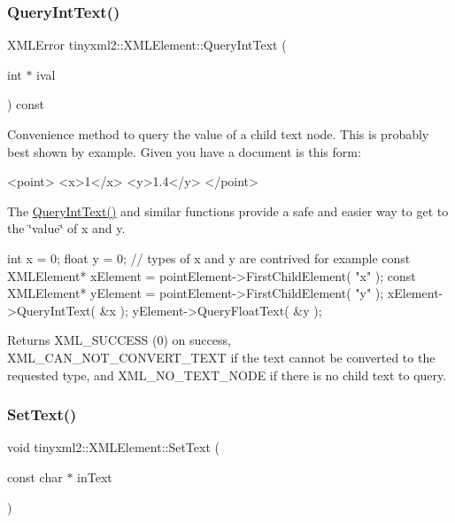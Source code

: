 \subsubsection{\texorpdfstring{QueryIntText()}{QueryIntText()}}
{\footnotesize\ttfamily X\+M\+L\+Error tinyxml2\+::\+X\+M\+L\+Element\+::\+Query\+Int\+Text (\begin{DoxyParamCaption}\item[{int $\ast$}]{ival }\end{DoxyParamCaption}) const}

Convenience method to query the value of a child text node. This is probably best shown by example. Given you have a document is this form\+: \begin{DoxyVerb}    <point>
        <x>1</x>
        <y>1.4</y>
    </point>
\end{DoxyVerb}


The \mbox{\hyperlink{classtinyxml2_1_1XMLElement_a926357996bef633cb736e1a558419632}{Query\+Int\+Text()}} and similar functions provide a safe and easier way to get to the \char`\"{}value\char`\"{} of x and y.

\begin{DoxyVerb}    int x = 0;
    float y = 0;    // types of x and y are contrived for example
    const XMLElement* xElement = pointElement->FirstChildElement( "x" );
    const XMLElement* yElement = pointElement->FirstChildElement( "y" );
    xElement->QueryIntText( &x );
    yElement->QueryFloatText( &y );
\end{DoxyVerb}


\begin{DoxyReturn}{Returns}
X\+M\+L\+\_\+\+S\+U\+C\+C\+E\+SS (0) on success, X\+M\+L\+\_\+\+C\+A\+N\+\_\+\+N\+O\+T\+\_\+\+C\+O\+N\+V\+E\+R\+T\+\_\+\+T\+E\+XT if the text cannot be converted to the requested type, and X\+M\+L\+\_\+\+N\+O\+\_\+\+T\+E\+X\+T\+\_\+\+N\+O\+DE if there is no child text to query. 
\end{DoxyReturn}
\mbox{\label{classtinyxml2_1_1XMLElement_a1f9c2cd61b72af5ae708d37b7ad283ce}} 
\subsubsection{\texorpdfstring{SetText()}{SetText()}}
{\footnotesize\ttfamily void tinyxml2\+::\+X\+M\+L\+Element\+::\+Set\+Text (\begin{DoxyParamCaption}\item[{const char $\ast$}]{in\+Text }\end{DoxyParamCaption})}

